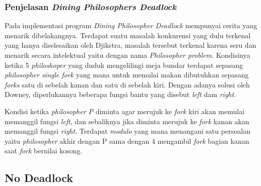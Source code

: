 \documentclass[11pt,a4paper]{article}
\begin{document}
\subsubsection{Penjelasan \textit{Dining Philosophers Deadlock}}
Pada implementasi program \textit{Dining Philosopher Deadlock} mempunyai cerita yang menarik dibelakangnya. Terdapat suatu masalah konkurensi yang dulu terkenal yang hanya diselesaikan 
oleh Djikstra, masalah tersebut terkenal karena seru dan menarik secara intelektual yaitu dengan nama \textit{Philosopher problem}. Kondisinya ketika 5 \textit{philoshoper} yang duduk mengelilingi 
meja bundar terdapat sepasang \textit{philosopher single fork} yang mana untuk memulai makan dibutuhkan sepasang \textit{forks} satu di sebelah kanan dan satu di sebelah kiri. Dengan adanya solusi oleh 
Downey, diperlukannya beberapa fungsi bantu yang disebut \textit{left} dam \textit{right}. \par
Kondisi ketika \textit{philosopher P} diminta agar merujuk ke \textit{fork} kiri akan memulai memanggil fungsi \textit{left}, dan sebaliknya jika diminta merujuk ke \textit{fork} kanan akan memanggil fungsi 
\textit{right}. Terdapat \textit{modulo} yang mana menangani satu persoalan yaitu \textit{philosopher} akhir dengan P sama dengan 4 mengambil \textit{fork} bagian kanan saat \textit{fork} bernilai kosong.

\subsection{No Deadlock}
\end{document}
